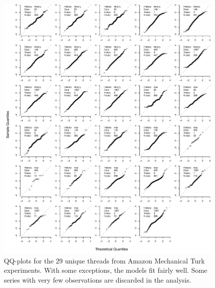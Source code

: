 \documentclass[9pt,a4paper,twocolumn,lineno]{article}
\begin{document}
\begin{figure}%
\centering
	\hspace{-30px}\includegraphics[width=1\linewidth]{qqplots}
	\caption{QQ-plots for the 29 unique threads from Amazon Mechanical Turk experiments. With some exceptions, the models fit fairly well. Some series with very few observations are discarded in the analysis.}\label{fig: QQ plots AMT}
\end{figure}
\newpage
\end{document}
